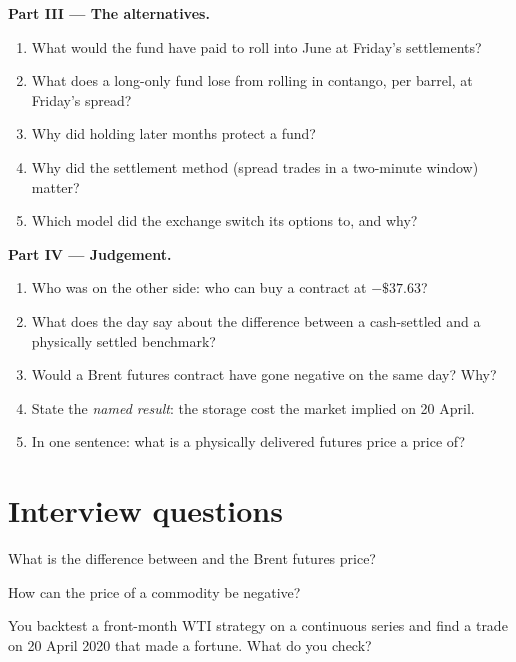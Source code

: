 \begin{problem}
\medskip\noindent\textbf{Part III --- The alternatives.}
\begin{enumerate}[resume]
\item What would the fund have paid to roll into June at Friday's settlements?
\item What does a long-only fund lose from rolling in contango, per barrel, at Friday's spread?
\item Why did holding later months protect a fund?
\item Why did the settlement method (spread trades in a two-minute window) matter?
\item Which model did the exchange switch its options to, and why?
\end{enumerate}

\medskip\noindent\textbf{Part IV --- Judgement.}
\begin{enumerate}[resume]
\item Who was on the other side: who can buy a contract at $-\$37.63$?
\item What does the day say about the difference between a cash-settled and a
physically settled benchmark?
\item Would a Brent futures contract have gone negative on the same day? Why?
\item State the \emph{named result}: the storage cost the market implied on 20 April.
\item In one sentence: what is a physically delivered futures price a price of?
\end{enumerate}
\end{problem}

\section{Interview questions}

\begin{interviewq}\label{iq:m3:crude-oil:1}
What is the difference between  and the Brent futures price?
\end{interviewq}

\begin{interviewq}\label{iq:m3:crude-oil:2}
How can the price of a commodity be negative?
\end{interviewq}

\begin{interviewq}\label{iq:m3:crude-oil:3}
You backtest a front-month WTI strategy on a continuous series and find a trade on 20
April 2020 that made a fortune. What do you check?
\end{interviewq}

